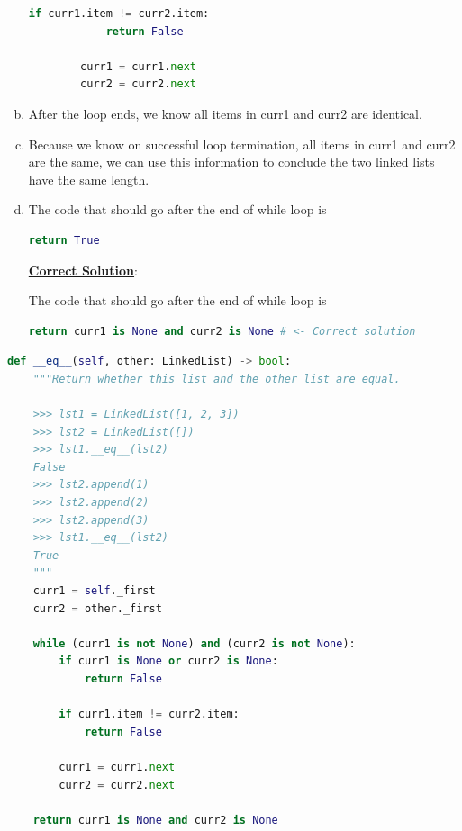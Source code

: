 \documentclass[12pt]{article}
\begin{document}
\begin{enumerate}[a.]
\begin{lstlisting}[language=Python]
        if curr1.item != curr2.item:
            return False

        curr1 = curr1.next
        curr2 = curr2.next
    \end{lstlisting}

    \item

    After the loop ends, we know all items in curr1 and curr2 are identical.

    \item

    Because we know on successful loop termination, all items in curr1 and curr2
    are the same, we can use this information to conclude the two linked lists
    have the same length.

    \item

    The code that should go after the end of while loop is

    \begin{lstlisting}[language=Python]
    return True
    \end{lstlisting}

    \begin{mdframed}
        \underline{\textbf{Correct Solution}}:

        \bigskip

        The code that should go after the end of while loop is

        \begin{lstlisting}[language=Python]
        return curr1 is None and curr2 is None # <- Correct solution
        \end{lstlisting}
    \end{mdframed}

\end{enumerate}

\bigskip

\begin{lstlisting}[language=Python,caption={worksheet\_13\_q2\_solution.py},captionpos=b]
def __eq__(self, other: LinkedList) -> bool:
    """Return whether this list and the other list are equal.

    >>> lst1 = LinkedList([1, 2, 3])
    >>> lst2 = LinkedList([])
    >>> lst1.__eq__(lst2)
    False
    >>> lst2.append(1)
    >>> lst2.append(2)
    >>> lst2.append(3)
    >>> lst1.__eq__(lst2)
    True
    """
    curr1 = self._first
    curr2 = other._first

    while (curr1 is not None) and (curr2 is not None):
        if curr1 is None or curr2 is None:
            return False

        if curr1.item != curr2.item:
            return False

        curr1 = curr1.next
        curr2 = curr2.next

    return curr1 is None and curr2 is None
\end{lstlisting}
\end{document}
